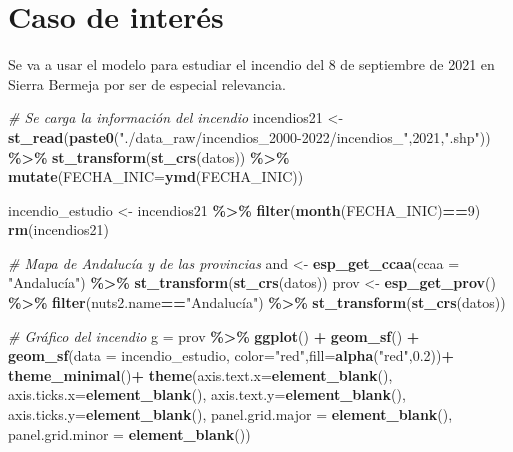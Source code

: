 \documentclass[12pt,a4paper,]{book}
\newenvironment{Shaded}{\begin{snugshade}}{\end{snugshade}}
\newcommand{\AttributeTok}[1]{\textcolor[rgb]{0.13,0.29,0.53}{#1}}
\newcommand{\CommentTok}[1]{\textcolor[rgb]{0.56,0.35,0.01}{\textit{#1}}}
\newcommand{\DecValTok}[1]{\textcolor[rgb]{0.00,0.00,0.81}{#1}}
\newcommand{\FloatTok}[1]{\textcolor[rgb]{0.00,0.00,0.81}{#1}}
\newcommand{\FunctionTok}[1]{\textcolor[rgb]{0.13,0.29,0.53}{\textbf{#1}}}
\newcommand{\NormalTok}[1]{#1}
\newcommand{\OtherTok}[1]{\textcolor[rgb]{0.56,0.35,0.01}{#1}}
\newcommand{\SpecialCharTok}[1]{\textcolor[rgb]{0.81,0.36,0.00}{\textbf{#1}}}
\newcommand{\StringTok}[1]{\textcolor[rgb]{0.31,0.60,0.02}{#1}}
\numberwithin{dummy}{section}
\theoremstyle{ocrenumbox}
\theoremstyle{blacknumex}
\theoremstyle{blacknumbox}
\theoremstyle{ocrenum}
\theoremstyle{ocrenum}
\begin{document}
\hypertarget{caso-de-interuxe9s}{%
\section{Caso de interés}\label{caso-de-interuxe9s}}

Se va a usar el modelo para estudiar el incendio del 8 de septiembre de
2021 en Sierra Bermeja por ser de especial relevancia.

\begin{Shaded}
\begin{Highlighting}[]
\CommentTok{\# Se carga la información del incendio}
\NormalTok{incendios21 }\OtherTok{\textless{}{-}} \FunctionTok{st\_read}\NormalTok{(}\FunctionTok{paste0}\NormalTok{(}\StringTok{"./data\_raw/incendios\_2000{-}2022/incendios\_"}\NormalTok{,}\DecValTok{2021}\NormalTok{,}\StringTok{".shp"}\NormalTok{)) }\SpecialCharTok{\%\textgreater{}\%} 
  \FunctionTok{st\_transform}\NormalTok{(}\FunctionTok{st\_crs}\NormalTok{(datos)) }\SpecialCharTok{\%\textgreater{}\%} 
  \FunctionTok{mutate}\NormalTok{(}\AttributeTok{FECHA\_INIC=}\FunctionTok{ymd}\NormalTok{(FECHA\_INIC))}

\NormalTok{incendio\_estudio }\OtherTok{\textless{}{-}}\NormalTok{ incendios21 }\SpecialCharTok{\%\textgreater{}\%} \FunctionTok{filter}\NormalTok{(}\FunctionTok{month}\NormalTok{(FECHA\_INIC)}\SpecialCharTok{==}\DecValTok{9}\NormalTok{)}
\FunctionTok{rm}\NormalTok{(incendios21)}

\CommentTok{\# Mapa de Andalucía y de las provincias}
\NormalTok{and }\OtherTok{\textless{}{-}} \FunctionTok{esp\_get\_ccaa}\NormalTok{(}\AttributeTok{ccaa =} \StringTok{"Andalucía"}\NormalTok{) }\SpecialCharTok{\%\textgreater{}\%} \FunctionTok{st\_transform}\NormalTok{(}\FunctionTok{st\_crs}\NormalTok{(datos))}
\NormalTok{prov }\OtherTok{\textless{}{-}} \FunctionTok{esp\_get\_prov}\NormalTok{() }\SpecialCharTok{\%\textgreater{}\%} \FunctionTok{filter}\NormalTok{(nuts2.name}\SpecialCharTok{==}\StringTok{"Andalucía"}\NormalTok{) }\SpecialCharTok{\%\textgreater{}\%} \FunctionTok{st\_transform}\NormalTok{(}\FunctionTok{st\_crs}\NormalTok{(datos))}

\CommentTok{\# Gráfico del incendio}
\NormalTok{g }\OtherTok{=}\NormalTok{ prov }\SpecialCharTok{\%\textgreater{}\%} 
  \FunctionTok{ggplot}\NormalTok{() }\SpecialCharTok{+}
  \FunctionTok{geom\_sf}\NormalTok{() }\SpecialCharTok{+} 
  \FunctionTok{geom\_sf}\NormalTok{(}\AttributeTok{data =}\NormalTok{ incendio\_estudio, }\AttributeTok{color=}\StringTok{"red"}\NormalTok{,}\AttributeTok{fill=}\FunctionTok{alpha}\NormalTok{(}\StringTok{"red"}\NormalTok{,}\FloatTok{0.2}\NormalTok{))}\SpecialCharTok{+}
  \FunctionTok{theme\_minimal}\NormalTok{()}\SpecialCharTok{+}
  \FunctionTok{theme}\NormalTok{(}\AttributeTok{axis.text.x=}\FunctionTok{element\_blank}\NormalTok{(),}
        \AttributeTok{axis.ticks.x=}\FunctionTok{element\_blank}\NormalTok{(),}
        \AttributeTok{axis.text.y=}\FunctionTok{element\_blank}\NormalTok{(),}
        \AttributeTok{axis.ticks.y=}\FunctionTok{element\_blank}\NormalTok{(),}
        \AttributeTok{panel.grid.major =} \FunctionTok{element\_blank}\NormalTok{(),}
        \AttributeTok{panel.grid.minor =} \FunctionTok{element\_blank}\NormalTok{()) }


\end{Highlighting}
\end{Shaded}
\end{document}
